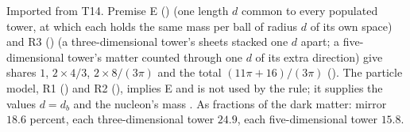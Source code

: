 Imported from T14. Premise E () (one length $d$ common to every populated tower, at which each holds the same mass per ball of radius $d$ of its own space) and R3 () (a three-dimensional tower's sheets stacked one $d$ apart; a five-dimensional tower's matter counted through one $d$ of its extra direction) give shares $1$, $2 \times 4/3$, $2 \times 8/(3\pi)$ and the total $(11\pi + 16)/(3\pi)$ \cite[Prem.~7.2, Prem.~7.4, Prop.~7.6(i)]{ButlerT14} (). The particle model, R1 () and R2 (), implies E and is not used by the rule; it supplies the values $d = d_{b}$ and the nucleon's mass \cite[Prem.~7.3, Prop.~7.6(ii)]{ButlerT14}. As fractions of the dark matter: mirror $18.6$ percent, each three-dimensional tower $24.9$, each five-dimensional tower $15.8$.
